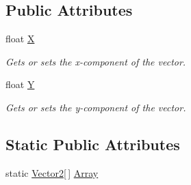 \subsection*{Public Attributes}
\begin{DoxyCompactItemize}
\item 
float \hyperlink{struct_microsoft_1_1_xna_1_1_framework_1_1_vector2_a2adf6ff3693ba54d76fdee8c202ec522}{X}
\begin{DoxyCompactList}\small\item\em Gets or sets the x-\/component of the vector.\end{DoxyCompactList}\item 
float \hyperlink{struct_microsoft_1_1_xna_1_1_framework_1_1_vector2_adb6b2d6af0cc594ae0f8e0b312663ef5}{Y}
\begin{DoxyCompactList}\small\item\em Gets or sets the y-\/component of the vector.\end{DoxyCompactList}\end{DoxyCompactItemize}
\subsection*{Static Public Attributes}
\begin{DoxyCompactItemize}
\item 
static \hyperlink{struct_microsoft_1_1_xna_1_1_framework_1_1_vector2}{Vector2}\mbox{[}$\,$\mbox{]} \hyperlink{struct_microsoft_1_1_xna_1_1_framework_1_1_vector2_ae680588c59bced140b0202ae87b35909}{Array}
\end{DoxyCompactItemize}
